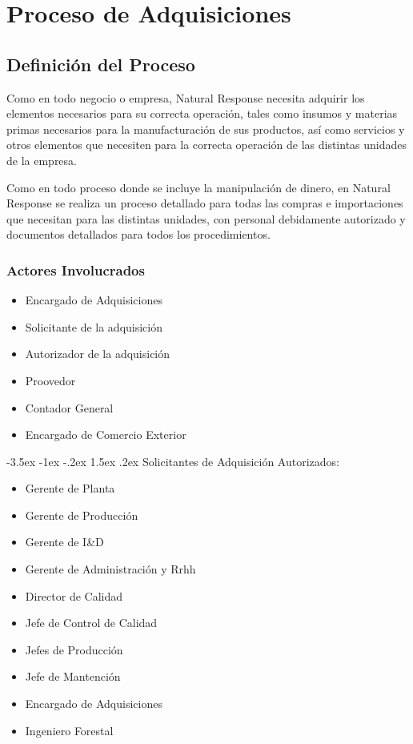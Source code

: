 \documentclass[12pt,letterpaper]{article}
\makeatletter
\newcommand\subsubsubsection{\@startsection {paragraph}{1}{\z@}%
                                   {-3.5ex \@plus -1ex \@minus -.2ex}%
                                   {1.5ex \@plus.2ex}%
                                   {\normalfont\bfseries}}
\makeatother
\begin{document}
\section{Proceso de Adquisiciones}

\subsection{Definición del Proceso}
Como en todo negocio o empresa, Natural Response necesita adquirir los elementos necesarios para su correcta operación, tales como insumos y materias primas necesarios para la manufacturación de sus productos, así como servicios y otros elementos que necesiten para la correcta operación de las distintas unidades de la empresa.

Como en todo proceso donde se incluye la manipulación de dinero, en Natural Response se realiza un proceso detallado para todas las compras e importaciones que necesitan para las distintas unidades, con personal debidamente autorizado y documentos detallados para todos los procedimientos.

\subsubsection{Actores Involucrados}
\begin{itemize}
\item Encargado de Adquisiciones
\item Solicitante de la adquisición
\item Autorizador de la adquisición
\item Proovedor
\item Contador General
\item Encargado de Comercio Exterior
\end{itemize}

\subsubsubsection{Solicitantes de Adquisición Autorizados:}
\begin{itemize}
\item Gerente de Planta
\item Gerente de Producción
\item Gerente de I\&D
\item Gerente de Administración y Rrhh
\item Director de Calidad
\item Jefe de Control de Calidad
\item Jefes de Producción
\item Jefe de Mantención
\item Encargado de Adquisiciones
\item Ingeniero Forestal
\end{itemize}
\end{document}
